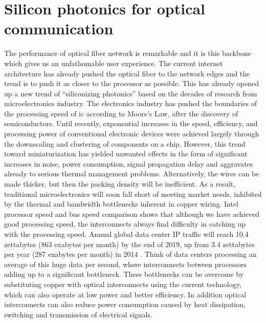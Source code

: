 \documentclass[../report.tex]{subfiles}
\begin{document}
	\section{Silicon photonics for optical communication}
The performance of optical fiber network is remarkable and it is this backbone which gives us an unfathomable user experience. The current internet architecture has already pushed the optical fiber to the network edges and the trend is to push it as closer to the processor as possible. This has already opened up a new trend of “siliconizing photonics” \cite{silicon_photonics} based on the decades of research from microelectronics industry. The electronics industry has pushed the boundaries of the processing speed of \gls{ic} according to Moore’s Law, after the discovery of semiconductors. Until recently, exponential increases in the speed, efficiency, and processing power of conventional electronic devices were achieved largely through the downscaling and clustering of components on a chip. However, this trend toward miniaturization has yielded unwanted effects in the form of significant increases in noise, power consumption, signal propagation delay and aggravates already to serious thermal management problems. Alternatively, the wires can be made thicker, but then the packing density will be inefficient. As a result, traditional microelectronics will soon fall short of meeting market needs, inhibited by the thermal and bandwidth bottlenecks inherent in copper wiring. Intel processor speed and bus speed comparison \cite{intel_proc_compare} shows that although we have achieved good processing speed, the interconnects always find difficulty in catching up with the processing speed. Annual global data center IP traffic will reach 10.4 zettabytes (863 exabytes per month) by the end of 2019, up from 3.4 zettabytes per year (287 exabytes per month) in 2014 \cite{cisco_forecast_2019}. Think of data centers processing an average of this huge data per second, where interconnects between processors adding up to a significant bottleneck. These bottlenecks can be overcome by substituting copper with optical interconnects using the current technology, which can also operate at low power and better efficiency. In addition optical interconnects can also reduce power consumption caused by heat dissipation, switching and transmission of electrical signals.\par
\end{document}

